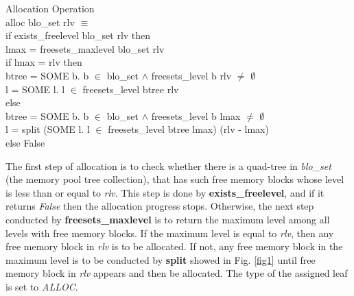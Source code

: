 \documentclass[runningheads]{llncs}
\begin{document}
\begin{definition} {Allocation Operation} \\
alloc blo\_set rlv $\equiv$ \\
\phantom{x} \hspace{10pt} if exists\_freelevel blo\_set rlv then \\
\phantom{x} \hspace{20pt} lmax = freesets\_maxlevel blo\_set rlv \\
\phantom{x} \hspace{20pt} if lmax = rlv then \\
\phantom{x} \hspace{30pt} btree = SOME b. b $\in$ blo\_set $\wedge$ freesets\_level b rlv $\ne$ $\emptyset$ \\
\phantom{x} \hspace{30pt} l = SOME l. l $\in$ freesets\_level btree rlv \\
\phantom{x} \hspace{20pt} else \\
\phantom{x} \hspace{30pt} btree = SOME b. b $\in$ blo\_set $\wedge$ freesets\_level b lmax $\ne$ $\emptyset$ \\
\phantom{x} \hspace{30pt} l = split (SOME l. l $\in$ freesets\_level btree lmax) (rlv - lmax) \\
\phantom{x} \hspace{10pt} else False
\end{definition}

The first step of allocation is to check whether there is a quad-tree in \textsl{blo\_set} (the memory pool tree collection), that has such free memory blocks whose level is less than or equal to \textsl{rlv}. This step is done by \textbf{exists\_freelevel}, and if it returns \textsl{False} then the allocation progress stops. Otherwise, the next step conducted by \textbf{freesets\_maxlevel} is to return the maximum level among all levels with free memory blocks. If the maximum level is equal to \textsl{rlv}, then any free memory block in \textsl{rlv} is to be allocated. If not, any free memory block in the maximum level is to be conducted by \textbf{split} showed in Fig. \ref{fig1} until free memory block in \textsl{rlv} appears and then be allocated. The type of the assigned leaf is set to \textsl{ALLOC}.
\end{document}
